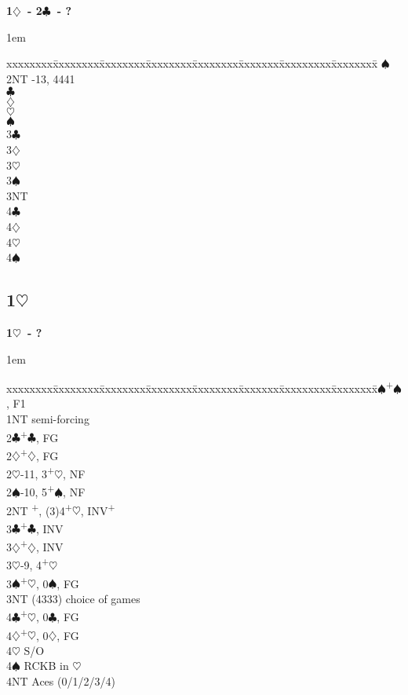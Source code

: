 \documentclass[10pt]{article}
\renewcommand{\c}{$\clubsuit$}
\renewcommand{\d}{$\diamondsuit$}
\newcommand{\h}{$\heartsuit$}
\newcommand{\s}{$\spadesuit$}
\newcommand{\p}{\textsuperscript{+}}
\newenvironment{bidtable}[1][]
{\textbf{#1}
  \begin{adjustwidth}{1em}{}
    \addvspace{2pt}
    \begin{tabbing}
      xxxxxxxx\=xxxxxxxx\=xxxxxxxx\=xxxxxxxx\=xxxxxxxx\=xxxxxxx\=xxxxxxxxx\=xxxxxxxx\=\kill}
{\end{tabbing}\end{adjustwidth}\bigskip}%
\newcommand{\pdfh}{\texorpdfstring{\h{}}{H}}
\begin{document}
\begin{bidtable}[1\d\ - 2\c\ - ?]
    \s \>                                    \\
2NT -13, 4441                               \\
    \c \>                                    \\
    \d \>                                    \\
    \h \>                                    \\
    \s \>                                    \\
3\c \>                                           \\
3\d \>                                           \\
3\h \>                                           \\
3\s \>                                           \\
3NT \>                                           \\
4\c \>                                           \\
4\d \>                                           \\
4\h \>                                           \\
4\s \>                                           \\
\end{bidtable}
\newpage
\subsection{1\pdfh}


\begin{bidtable}[1\h\ - ?]
1\s {}\p\s, F1              \\
1NT \> semi-forcing           \\
2\c {}\p\c, FG              \\
2\d {}\p\d, FG              \\
2\h {}-11, 3\p\h, NF        \\
2\s {}-10, 5\p\s, NF        \\
2NT \p, (3)4\p\h, INV\p  \\
3\c {}\p\c, INV             \\
3\d {}\p\d, INV             \\
3\h {}-9, 4\p\h             \\
3\s {}\p\h, 0\s, FG         \\
3NT \> (4333) choice of games \\
4\c {}\p\h, 0\c, FG         \\
4\d {}\p\h, 0\d, FG         \\
4\h \> S/O                    \\
4\s \> RCKB in \h             \\
4NT \> Aces (0/1/2/3/4)       \\
\end{bidtable}
\end{document}
